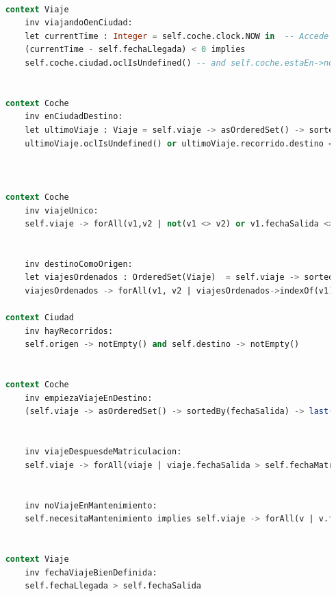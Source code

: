 \documentclass[12pt.a4paper]{article}
\begin{document}
\begin{lstlisting}[style = useNormal,language=SQL, caption={Modelo de Sistema de Coches en USE}]
    
    context Viaje
        inv viajandoOenCiudad:
        let currentTime : Integer = self.coche.clock.NOW in  -- Accede al tiempo actual
        (currentTime - self.fechaLlegada) < 0 implies
        self.coche.ciudad.oclIsUndefined() -- and self.coche.estaEn->notEmpty() -- El coche existe en una ubicacion valida
    
    
    context Coche
        inv enCiudadDestino:
        let ultimoViaje : Viaje = self.viaje -> asOrderedSet() -> sortedBy(fechaLlegada) -> last() in
        ultimoViaje.oclIsUndefined() or ultimoViaje.recorrido.destino = self.ciudad
        
    
    
    context Coche
        inv viajeUnico:
        self.viaje -> forAll(v1,v2 | not(v1 <> v2) or v1.fechaSalida <> v2.fechaSalida and (v1.fechaLlegada <= v2.fechaSalida or v2.fechaLlegada <= v1.fechaSalida))
    
    
        inv destinoComoOrigen:
        let viajesOrdenados : OrderedSet(Viaje)  = self.viaje -> sortedBy(v | v.fechaSalida) in 
        viajesOrdenados -> forAll(v1, v2 | viajesOrdenados->indexOf(v1) = viajesOrdenados->indexOf(v2) + 1 implies v1.recorrido.destino = v2.recorrido.origen)
    
    context Ciudad
        inv hayRecorridos:
        self.origen -> notEmpty() and self.destino -> notEmpty()
    
       
    context Coche
        inv empiezaViajeEnDestino:
        (self.viaje -> asOrderedSet() -> sortedBy(fechaSalida) -> last()).recorrido.destino = self.ciudad
    
    
        inv viajeDespuesdeMatriculacion:
        self.viaje -> forAll(viaje | viaje.fechaSalida > self.fechaMatriculacion)    
    
    
        inv noViajeEnMantenimiento:
        self.necesitaMantenimiento implies self.viaje -> forAll(v | v.fechaLlegada < self.clock.NOW)
    
    
    context Viaje
        inv fechaViajeBienDefinida:
        self.fechaLlegada > self.fechaSalida
    


\end{lstlisting}
\vspace{1cm}
\end{document}
